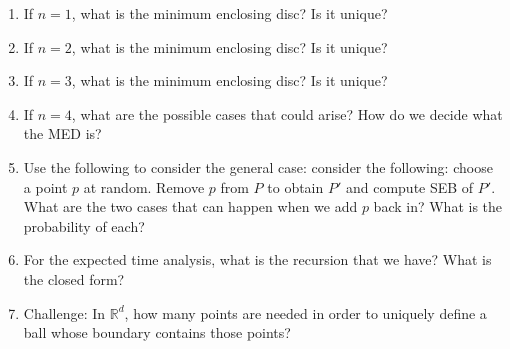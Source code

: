 \documentclass{article}
\def\R{{\mathbb R}}
\begin{document}
\begin{enumerate}
    \item If $n=1$, what is the minimum enclosing disc?  Is it unique?
        \vspace{3ex}
    \item If $n=2$, what is the minimum enclosing disc?  Is it unique?
        \vspace{3ex}
    \item If $n=3$, what is the minimum enclosing disc?  Is it unique?
        \vspace{3ex}
    \item If $n=4$, what are the possible cases that could arise?  How do we
        decide what the MED is?
        \vspace{3ex}
    \item Use the following to consider the general case:
        consider the following: choose a point $p$ at random.  Remove $p$ from $P$
        to obtain $P'$
        and compute SEB of $P'$.  What are the two cases that can happen when we
        add $p$ back in?  What is the probability of each?
        \vspace{3ex}
    \item For the expected time analysis, what is the recursion that we have?
        What is the closed form?
        \vspace{3ex}
    \item Challenge: In $\R^d$, how many points are needed in order to uniquely define a
        ball whose boundary contains those points?
        \vspace{3ex}
\end{enumerate}
\end{document}
